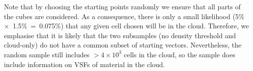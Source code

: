 Note that by choosing the starting points randomly we ensure that all parts of the cubes are considered. 
As a consequence, there is only a small likelihood (5\%~$\times$~1.5\%~=~0.075\%) that any given cell chosen will be in the cloud.
Therefore, we emphasise that it is likely that the two subsamples (no density threshold and cloud-only) do not have a common subset of starting vectors.
Nevertheless, the random sample still includes $>4 \times 10^3$ cells in the cloud, so the sample does include information on VSFs of material in the cloud.

\endinput
